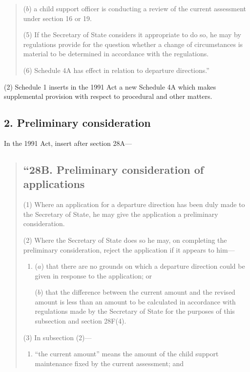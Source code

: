 \documentclass[a4paper]{article}
\begin{document}
{\begin{quotation}
\begin{enumerate}
($b$) a child support officer is conducting a review of the current assessment under section 16 or 19.
\end{enumerate}

(5) If the Secretary of State considers it appropriate to do so, he may by regulations provide for the question whether a change of circumstances is material to be determined in accordance with the regulations.

(6) Schedule 4A has effect in relation to departure directions.”
\end{quotation}

(2) Schedule 1 inserts in the 1991 Act a new Schedule 4A which makes supplemental provision with respect to procedural and other matters.

\subsection{2. Preliminary consideration}

In the 1991 Act, insert after section 28A—
\begin{quotation}
\subsection*{“28B. Preliminary consideration of applications}

(1) Where an application for a departure direction has been duly made to the Secretary of State, he may give the application a preliminary consideration.

(2) Where the Secretary of State does so he may, on completing the preliminary consideration, reject the application if it appears to him—
\begin{enumerate}\item[]
($a$) that there are no grounds on which a departure direction could be given in response to the application; or

($b$) that the difference between the current amount and the revised amount is less than an amount to be calculated in accordance with regulations made by the Secretary of State for the purposes of this subsection and section 28F(4).
\end{enumerate}

(3) In subsection (2)—
\begin{enumerate}\item[]
    “the current amount” means the amount of the child support maintenance fixed by the current assessment; and


\end{enumerate}
\end{quotation}}
\end{document}
